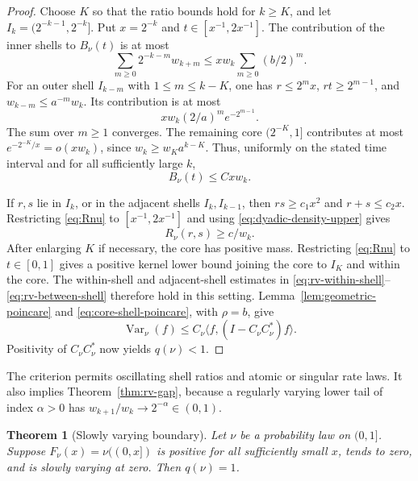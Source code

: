 \documentclass[11pt]{article}
\newtheorem{theorem}{Theorem}[section]
\theoremstyle{definition}
\theoremstyle{remark}
\newcommand{\Var}{\operatorname{Var}}
\begin{document}
\begin{proof}
Choose $K$ so that the ratio bounds hold for $k\ge K$, and let
$I_k=(2^{-k-1},2^{-k}]$.  Put $x=2^{-k}$ and
$t\in[x^{-1},2x^{-1}]$.  The contribution of the inner shells to
$B_\nu(t)$ is at most
\[
 \sum_{m\ge0}2^{-k-m}w_{k+m}
 \le xw_k\sum_{m\ge0}(b/2)^m.
\]
For an outer shell $I_{k-m}$ with $1\le m\le k-K$, one has
$r\le2^mx$, $rt\ge2^{m-1}$, and $w_{k-m}\le a^{-m}w_k$.  Its
contribution is at most
\[
 xw_k(2/a)^m e^{-2^{m-1}}.
\]
The sum over $m\ge1$ converges.  The remaining core $(2^{-K},1]$ contributes
at most $e^{-2^{-K}/x}=o(xw_k)$, since $w_k\ge w_Ka^{k-K}$.  Thus, uniformly
on the stated time interval and for all sufficiently large $k$,
\begin{equation}
 B_\nu(t)\le Cxw_k.
 \label{eq:dyadic-density-upper}
\end{equation}

If $r,s$ lie in $I_k$, or in the adjacent shells $I_k,I_{k-1}$, then
$rs\ge c_1x^2$ and $r+s\le c_2x$.  Restricting \eqref{eq:Rnu} to
$[x^{-1},2x^{-1}]$ and using \eqref{eq:dyadic-density-upper} gives
\[
 R_\nu(r,s)\ge c/w_k.
\]
After enlarging $K$ if necessary, the core has positive mass.  Restricting
\eqref{eq:Rnu} to $t\in[0,1]$ gives a positive kernel lower bound joining
the core to $I_K$ and within the core.  The within-shell and adjacent-shell
estimates in \eqref{eq:rv-within-shell}--\eqref{eq:rv-between-shell} therefore
hold in this setting.  Lemma~\ref{lem:geometric-poincare} and
\eqref{eq:core-shell-poincare}, with $\rho=b$, give
\[
 \Var_\nu(f)\le C_\nu\langle f,(I-C_\nu C_\nu^*)f\rangle.
\]
Positivity of $C_\nu C_\nu^*$ now yields $q(\nu)<1$.
\end{proof}

The criterion permits oscillating shell ratios and atomic or singular rate
laws.  It also implies Theorem~\ref{thm:rv-gap}, because a regularly varying
lower tail of index $\alpha>0$ has $w_{k+1}/w_k\to2^{-\alpha}\in(0,1)$.

\begin{theorem}[Slowly varying boundary]
\label{thm:slow-boundary}
Let $\nu$ be a probability law on $(0,1]$.  Suppose
$F_\nu(x)=\nu((0,x])$ is positive for all sufficiently small $x$, tends to
zero, and is slowly varying at zero.
Then $q(\nu)=1$.
\end{theorem}
\end{document}
